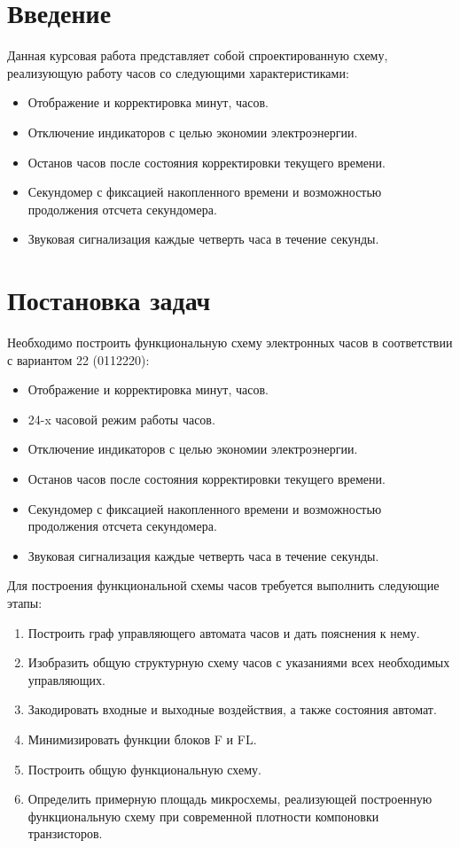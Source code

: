 \documentclass[10pt,a4paper,final]{article} %
\begin{document}
\tableofcontents

\newpage
{}
\section*{Введение}
Данная курсовая работа представляет собой спроектированную схему, реализующую работу часов со следующими характеристиками:

\begin{itemize}
	\item Отображение и корректировка минут, часов.
	\item Отключение индикаторов с целью экономии электроэнергии.
	\item Останов часов после состояния корректировки текущего времени.
	\item Секундомер с фиксацией накопленного времени и возможностью продолжения отсчета секундомера.
	\item Звуковая сигнализация каждые четверть часа в течение секунды.
\end{itemize}


\newpage
\section{Постановка задач}
Необходимо построить функциональную схему электронных часов в соответствии с вариантом 22 (0112220):
\begin{itemize}
	\item Отображение и корректировка минут, часов.
	\item 24-x часовой режим работы часов.
	\item Отключение индикаторов с целью экономии электроэнергии.
	\item Останов часов после состояния корректировки текущего времени.
	\item Секундомер с фиксацией накопленного времени и возможностью продолжения отсчета секундомера.
	\item Звуковая сигнализация каждые четверть часа в течение секунды.
\end{itemize}

Для построения функциональной схемы часов требуется выполнить следующие этапы:
\begin{enumerate}
	\item Построить граф управляющего автомата часов и дать пояснения к нему.
	\item Изобразить общую структурную схему часов с указаниями всех необходимых управляющих.
	\item Закодировать входные и выходные воздействия, а также  состояния автомат.
	\item  Минимизировать функции блоков F и FL.
	\item Построить общую функциональную схему.
	\item Определить примерную площадь микросхемы, реализующей построенную функциональную схему при современной плотности компоновки транзисторов.
\end{enumerate}
\end{document}
